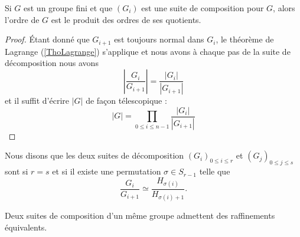 \begin{proposition}
    Si \( G\) est un groupe fini et que \( (G_i)\) est une suite de composition pour \( G\), alors l'ordre de \( G\) est le produit des ordres de ses quotients.
\end{proposition}

\begin{proof}
    Étant donné que \( G_{i+1}\) est toujours normal dans \( G_i\), le théorème de Lagrange (\ref{ThoLagrange}) s'applique et nous avons à chaque pas de la suite de décomposition nous avons
    \begin{equation}
        | \frac{ G_i }{ G_{i+1} } |=\frac{ | G_i | }{ | G_{i+1} | } 
    \end{equation}
    et il suffit d'écrire \( | G |\) de façon télescopique :
    \begin{equation}
        | G |=\prod_{0\leq i\leq n-1}\frac{ | G_i | }{ | G_{i+1} | }
    \end{equation}
\end{proof}

Nous disons que les deux suites de décomposition \( (G_i)_{0\leq i\leq r}\) et \( (G_j)_{0\leq j\leq s}\) sont  si \( r=s\) et si il existe une permutation \( \sigma\in S_{r-1}\) telle que
\begin{equation}
    \frac{ G_i }{ G_{i+1} }\simeq\frac{ H_{\sigma(i)} }{ H_{\sigma(i)+1} }.
\end{equation}

\begin{proposition}[Schreider]
    Deux suites de composition d'un même groupe admettent des raffinements équivalents.
\end{proposition}

